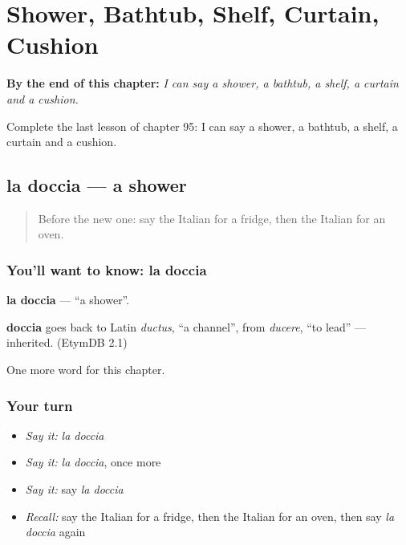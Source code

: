
\chapter{Shower, Bathtub, Shelf, Curtain, Cushion}
\label{ch:it-shower-bathtub-shelf-curtain-cushion}

\begin{chapteropening}
\textbf{By the end of this chapter:} \emph{I can say a shower, a bathtub, a shelf, a curtain and a cushion.}

Complete the last lesson of chapter 95: I can say a shower, a bathtub, a shelf, a curtain and a cushion.
\end{chapteropening}

\section[la doccia]{la doccia — a shower}

\label{lesson:IT-C95-doccia}



\begin{quote}
Before the new one: say the Italian for a fridge, then the Italian for an oven.
\end{quote}

\subsection*{You'll want to know: la doccia}
\textbf{la doccia} — \textquotedblleft{}a shower\textquotedblright{}.

\begin{cousinweb}
\textbf{doccia} goes back to Latin \emph{ductus}, \textquotedblleft{}a channel\textquotedblright{}, from \emph{ducere}, \textquotedblleft{}to lead\textquotedblright{} — inherited. (EtymDB 2.1)
\end{cousinweb}

\begin{grammarlens}[title={What you've built}]
One more word for this chapter.
\end{grammarlens}

\subsection*{Your turn}
\begin{itemize}
\raggedright
  \item \emph{Say it:} \emph{la doccia}
  \item \emph{Say it:} \emph{la doccia}, once more
  \item \emph{Say it:} say \emph{la doccia}
  \item \emph{Recall:} say the Italian for a fridge, then the Italian for an oven, then say \emph{la doccia} again
\end{itemize}

